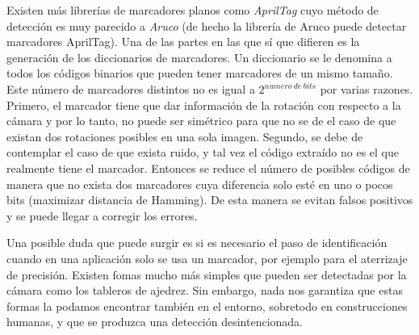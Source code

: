 Existen más librerías de marcadores planos como \textit{AprilTag} cuyo método de detección es muy parecido a \textit{Aruco} (de hecho la librería de Aruco puede detectar marcadores AprilTag). Una de las partes en las que sí que difieren es la generación de los diccionarios de marcadores. Un diccionario se le denomina a todos los códigos binarios que pueden tener marcadores de un mismo tamaño. Este número de marcadores distintos no es igual a $2^{n\acute{u}mero\ de\ bits}$ por varias razones. Primero, el marcador tiene que dar información de la rotación con respecto a la cámara y por lo tanto, no puede ser simétrico para que no se de el caso de que existan dos rotaciones posibles en una sola imagen. Segundo, se debe de contemplar el caso de que exista ruido, y tal vez el código extraído no es el que realmente tiene el marcador. Entonces se reduce el número de posibles códigos de manera que no exista dos marcadores cuya diferencia solo esté en uno o pocos bits (maximizar distancia de Hamming). De esta manera se evitan falsos positivos y se puede llegar a corregir los errores. 

Una posible duda que puede surgir es si es necesario el paso de identificación cuando en una aplicación solo se usa un marcador, por ejemplo para el aterrizaje de precisión. Existen fomas mucho más simples que pueden ser detectadas por la cámara como los tableros de ajedrez. Sin embargo, nada nos garantiza que estas formas la podamos encontrar también en el entorno, sobretodo en construcciones humanas, y que se produzca una detección desintencionada.

